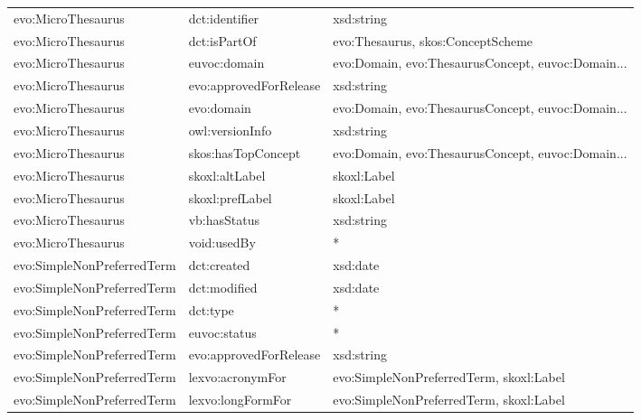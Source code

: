 \documentclass[10pt,a4paper,titlepage,final]{article}
\begin{document}
\begin{tabularx}{\textwidth}{llX}
         evo:MicroThesaurus &          dct:identifier &                                         xsd:string \\
         evo:MicroThesaurus &            dct:isPartOf &                  evo:Thesaurus, skos:ConceptScheme \\
         evo:MicroThesaurus &            euvoc:domain &  evo:Domain, evo:ThesaurusConcept, euvoc:Domain... \\
         evo:MicroThesaurus &  evo:approvedForRelease &                                         xsd:string \\
         evo:MicroThesaurus &              evo:domain &  evo:Domain, evo:ThesaurusConcept, euvoc:Domain... \\
         evo:MicroThesaurus &         owl:versionInfo &                                         xsd:string \\
         evo:MicroThesaurus &      skos:hasTopConcept &  evo:Domain, evo:ThesaurusConcept, euvoc:Domain... \\
         evo:MicroThesaurus &          skoxl:altLabel &                                        skoxl:Label \\
         evo:MicroThesaurus &         skoxl:prefLabel &                                        skoxl:Label \\
         evo:MicroThesaurus &            vb:hasStatus &                                         xsd:string \\
         evo:MicroThesaurus &             void:usedBy &                                                  * \\
 evo:SimpleNonPreferredTerm &             dct:created &                                           xsd:date \\
 evo:SimpleNonPreferredTerm &            dct:modified &                                           xsd:date \\
 evo:SimpleNonPreferredTerm &                dct:type &                                                  * \\
 evo:SimpleNonPreferredTerm &            euvoc:status &                                                  * \\
 evo:SimpleNonPreferredTerm &  evo:approvedForRelease &                                         xsd:string \\
 evo:SimpleNonPreferredTerm &        lexvo:acronymFor &            evo:SimpleNonPreferredTerm, skoxl:Label \\
 evo:SimpleNonPreferredTerm &       lexvo:longFormFor &            evo:SimpleNonPreferredTerm, skoxl:Label \\

\end{tabularx}
\end{document}
